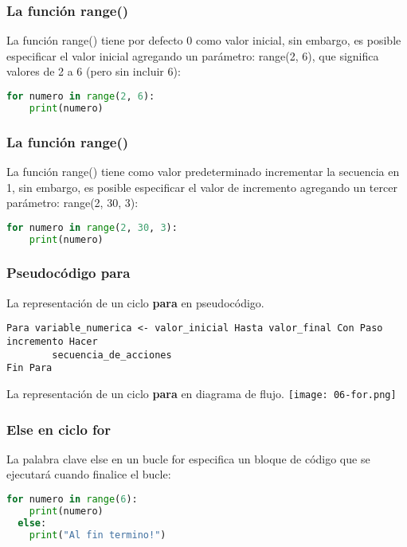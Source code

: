 \begin{frame}[fragile]
  \frametitle{La función \textbf{range}()}

  La función \textcolor{codeKeyword}{range}() tiene por defecto 0
  como valor inicial, sin embargo, es posible especificar el valor
  inicial agregando un parámetro: \textcolor{codeKeyword}{range}(2, 6),
  que significa valores de 2 a 6 (pero sin incluir 6):

  \vspace{\baselineskip}
  \begin{lstlisting}[language=Python]
  for numero in range(2, 6):
    print(numero)
  \end{lstlisting}
\end{frame}

\begin{frame}[fragile]
  \frametitle{La función \textbf{range}()}

  La función \textcolor{codeKeyword}{range}() tiene como valor
  predeterminado incrementar la secuencia en 1, sin embargo, es
  posible especificar el valor de incremento agregando un tercer
  parámetro: \textcolor{codeKeyword}{range}(2, 30, 3):

  \vspace{\baselineskip}
  \begin{lstlisting}[language=Python]
  for numero in range(2, 30, 3):
    print(numero)
  \end{lstlisting}
\end{frame}

\begin{frame}[fragile]
  \frametitle{Pseudocódigo \textbf{para}}
  La representación de un ciclo \textbf{para} en pseudocódigo.
  \begin{lstlisting}[style=pseudocodigo]
Para variable_numerica <- valor_inicial Hasta valor_final Con Paso incremento Hacer
		secuencia_de_acciones
Fin Para
  \end{lstlisting}

  La representación de un ciclo \textbf{para} en diagrama de flujo.
  \texttt{[image: 06-for.png]}
\end{frame}


\begin{frame}[fragile]
  \frametitle{\textbf{Else} en ciclo \textbf{for}}

  La palabra clave \textcolor{codeKeyword}{else} en un bucle for
  especifica un bloque de código que se ejecutará cuando
  finalice el bucle:

  \vspace{\baselineskip}
  \begin{lstlisting}[language=Python]
  for numero in range(6):
    print(numero)
  else:
    print("Al fin termino!")
  \end{lstlisting}
\end{frame}

